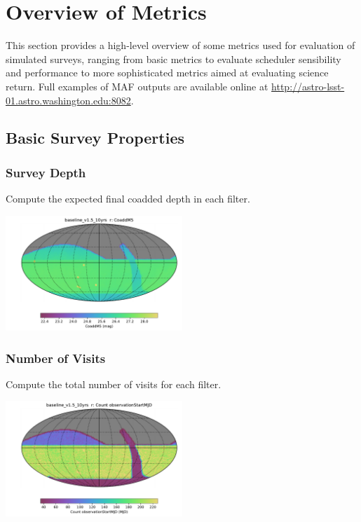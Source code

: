 \section{Overview of Metrics}
This section provides a high-level overview of some metrics used for evaluation of simulated surveys, ranging from basic metrics to evaluate scheduler sensibility and performance to more sophisticated metrics aimed at evaluating science return.
Full examples of MAF outputs are available online at \url{http://astro-lsst-01.astro.washington.edu:8082}.  

{\centering

\subsection{Basic Survey Properties}

\subsubsection{Survey Depth}

Compute the expected final coadded depth in each filter. 

\includegraphics[width=0.5\textwidth]{metric_summary/baseline_v1.5_10yrs/baseline_v1_5_10yrs_CoaddM5_r_HEAL_SkyMap.pdf}

\subsubsection{Number of Visits}

Compute the total number of visits for each filter.

\includegraphics[width=0.5\textwidth]{metric_summary/baseline_v1.5_10yrs/baseline_v1_5_10yrs_Count_observationStartMJD_r_HEAL_SkyMap.pdf}

}
